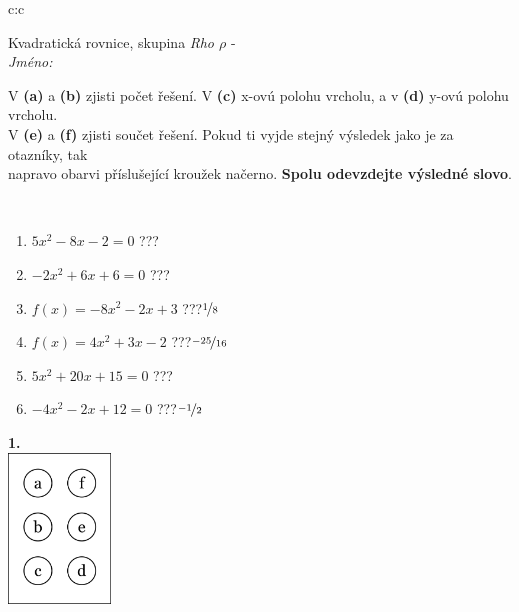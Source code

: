 \documentclass[10pt]{report}
\begin{document}
\begin{tabular}{c:c}
\begin{minipage}[c][104.5mm][t]{0.5\linewidth}
\begin{center}
\vspace{7mm}
{\huge Kvadratická rovnice, skupina \textit{Rho $\rho$} -}\\[5mm]
\textit{Jméno:}\phantom{xxxxxxxxxxxxxxxxxxxxxxxxxxxxxxxxxxxxxxxxxxxxxxxxxxxxxxxxxxxxxxxxx}\\[5mm]
\begin{minipage}{0.95\linewidth}
\begin{center}
V \textbf{(a)} a \textbf{(b)} zjisti počet řešení. V \textbf{(c)} x-ovú polohu vrcholu, a v \textbf{(d)} y-ovú polohu vrcholu.\\V \textbf{(e)} a \textbf{(f)} zjisti součet řešení. Pokud ti vyjde stejný výsledek jako je za otazníky, tak\\napravo obarvi příslušející kroužek načerno. \textbf{Spolu odevzdejte výsledné slovo}.
\end{center}
\end{minipage}
\\[1mm]
\begin{minipage}{0.79\linewidth}
\begin{center}
\begin{varwidth}{\linewidth}
\begin{enumerate}
\Large
\item $5x^2-8x-2=0$\quad \dotfill\; ???\;\dotfill {}
\item $-2x^2+6x+6=0$\quad \dotfill\; ???\;\dotfill {}
\item $f(x)=-8x^2-2x+3$\quad \dotfill\; ???\;\dotfill \quad $\nicefrac{1}{8}$
\item $f(x)=4x^2+3x-2$\quad \dotfill\; ???\;\dotfill \quad $\nicefrac{-25}{16}$
\item $5x^2+20x+15=0$\quad \dotfill\; ???\;\dotfill {}
\item $-4x^2-2x+12=0$\quad \dotfill\; ???\;\dotfill \quad $\nicefrac{-1}{2}$
\end{enumerate}
\end{varwidth}
\end{center}
\end{minipage}
\begin{minipage}{0.20\linewidth}
\begin{center}
{\Huge\bfseries 1.} \\[2mm]
\includegraphics[height=40mm]{../images/braille.png}

\end{center}
\end{minipage}
\end{center}
\end{minipage}
\end{tabular}
\end{document}
